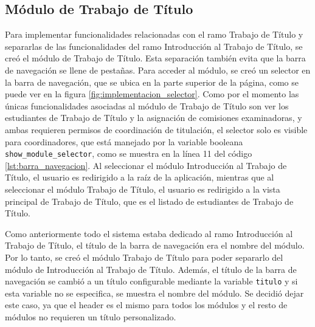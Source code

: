 \subsection{Módulo de Trabajo de Título}\label{sec:modulo_trabajo_titulo}
Para implementar funcionalidades relacionadas con el ramo Trabajo de Título y
separarlas de las funcionalidades del ramo Introducción al Trabajo de Título, se creó el
módulo de Trabajo de Título. Esta separación también evita que la barra de navegación se
llene de pestañas. Para acceder al módulo, se creó un selector en la barra de navegación,
que se ubica en la parte superior de la página, como se puede ver en la figura
\ref{fig:implementacion_selector}. Como por el momento las únicas funcionalidades asociadas
al módulo de Trabajo de Título son ver los estudiantes de Trabajo de Título y la asignación
de comisiones examinadoras, y ambas requieren permisos de coordinación de titulación, el
selector solo es visible para coordinadores, que está manejado por la variable booleana
\verb|show_module_selector|, como se muestra en la línea 11 del código \ref{lst:barra_navegacion}.
Al seleccionar el módulo Introducción al Trabajo de Título, el usuario es redirigido a la
raíz de la aplicación, mientras que al seleccionar el módulo Trabajo de Título, el usuario
es redirigido a la vista principal de Trabajo de Título, que es el listado de estudiantes de
Trabajo de Título.

Como anteriormente todo el sistema estaba dedicado al ramo Introducción al Trabajo de
Título, el título de la barra de navegación era el nombre del módulo. Por lo tanto, se
creó el módulo Trabajo de Título para poder separarlo del módulo de Introducción al
Trabajo de Título. Además, el título de la barra de navegación se cambió a un título
configurable mediante la variable \verb|titulo| y si esta variable no se especifica, se
muestra el nombre del módulo. Se decidió dejar este caso, ya que el header es el mismo para
todos los módulos y el resto de módulos no requieren un título personalizado.


